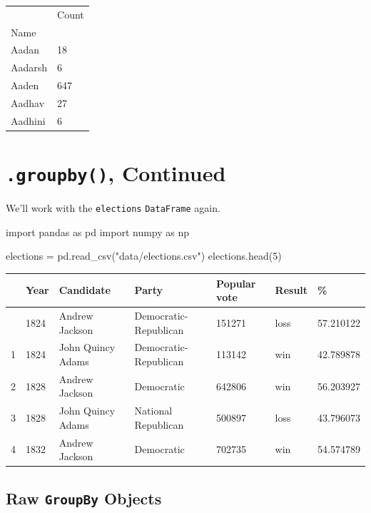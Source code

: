 \documentclass[
  letterpaper,
  DIV=11,
  numbers=noendperiod]{scrreprt}
\newenvironment{Shaded}{\begin{snugshade}}{\end{snugshade}}
\newcommand{\DecValTok}[1]{\textcolor[rgb]{0.68,0.00,0.00}{#1}}
\newcommand{\ImportTok}[1]{\textcolor[rgb]{0.00,0.46,0.62}{#1}}
\newcommand{\NormalTok}[1]{\textcolor[rgb]{0.00,0.23,0.31}{#1}}
\newcommand{\OperatorTok}[1]{\textcolor[rgb]{0.37,0.37,0.37}{#1}}
\newcommand{\StringTok}[1]{\textcolor[rgb]{0.13,0.47,0.30}{#1}}
\begin{document}
\begin{longtable}[]{@{}ll@{}}
\toprule\noalign{}
& Count \\
Name & \\
\midrule\noalign{}
\endhead
\bottomrule\noalign{}
\endlastfoot
Aadan & 18 \\
Aadarsh & 6 \\
Aaden & 647 \\
Aadhav & 27 \\
Aadhini & 6 \\
\end{longtable}

\section{\texorpdfstring{\texttt{.groupby()},
Continued}{.groupby(), Continued}}\label{groupby-continued}

We'll work with the \texttt{elections} \texttt{DataFrame} again.

\begin{Shaded}
\begin{Highlighting}[]
\ImportTok{import}\NormalTok{ pandas }\ImportTok{as}\NormalTok{ pd}
\ImportTok{import}\NormalTok{ numpy }\ImportTok{as}\NormalTok{ np}

\NormalTok{elections }\OperatorTok{=}\NormalTok{ pd.read\_csv(}\StringTok{"data/elections.csv"}\NormalTok{)}
\NormalTok{elections.head(}\DecValTok{5}\NormalTok{)}
\end{Highlighting}
\end{Shaded}

\begin{longtable}[]{@{}lllllll@{}}
\toprule\noalign{}
& Year & Candidate & Party & Popular vote & Result & \% \\
\midrule\noalign{}
\endhead
\bottomrule\noalign{}
\endlastfoot
0 & 1824 & Andrew Jackson & Democratic-Republican & 151271 & loss &
57.210122 \\
1 & 1824 & John Quincy Adams & Democratic-Republican & 113142 & win &
42.789878 \\
2 & 1828 & Andrew Jackson & Democratic & 642806 & win & 56.203927 \\
3 & 1828 & John Quincy Adams & National Republican & 500897 & loss &
43.796073 \\
4 & 1832 & Andrew Jackson & Democratic & 702735 & win & 54.574789 \\
\end{longtable}

\subsection{\texorpdfstring{Raw \texttt{GroupBy}
Objects}{Raw GroupBy Objects}}\label{raw-groupby-objects}
\end{document}
